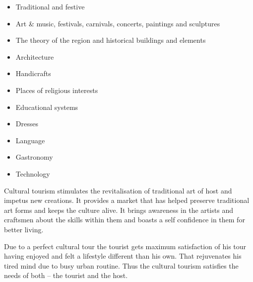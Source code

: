 \begin{itemize}[noitemsep]
  \item Traditional and festive
  \item Art \& music, festivals, carnivals, concerts, paintings and sculptures
  \item The theory of the region and historical buildings and elements
  \item Architecture
  \item Handicrafts
  \item Places of religious interests
  \item Educational systems
  \item Dresses
  \item Language
  \item Gastronomy
  \item Technology
\end{itemize}

\noindent Cultural tourism stimulates the revitalisation of traditional art of host and impetus new creations. It provides a market that has helped preserve traditional art forms and keeps the culture alive. It brings awareness in the artists and craftsmen about the skills within them and boasts a self confidence in them for better living.

Due to a perfect cultural tour the tourist gets maximum satisfaction of his tour having enjoyed and felt a lifestyle different than his own. That rejuvenates his tired mind due to busy urban routine. Thus the cultural tourism satisfies the needs of both -- the tourist and the host.


